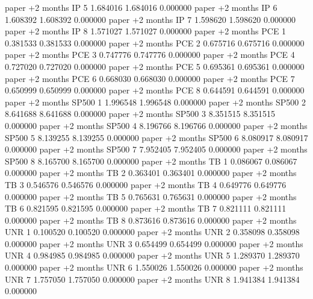      paper +2 months       IP                 5 1.684016       1.684016           0.000000
     paper +2 months       IP                 6 1.608392       1.608392           0.000000
     paper +2 months       IP                 7 1.598620       1.598620           0.000000
     paper +2 months       IP                 8 1.571027       1.571027           0.000000
     paper +2 months      PCE                 1 0.381533       0.381533           0.000000
     paper +2 months      PCE                 2 0.675716       0.675716           0.000000
     paper +2 months      PCE                 3 0.747776       0.747776           0.000000
     paper +2 months      PCE                 4 0.727020       0.727020           0.000000
     paper +2 months      PCE                 5 0.695361       0.695361           0.000000
     paper +2 months      PCE                 6 0.668030       0.668030           0.000000
     paper +2 months      PCE                 7 0.650999       0.650999           0.000000
     paper +2 months      PCE                 8 0.644591       0.644591           0.000000
     paper +2 months    SP500                 1 1.996548       1.996548           0.000000
     paper +2 months    SP500                 2 8.641688       8.641688           0.000000
     paper +2 months    SP500                 3 8.351515       8.351515           0.000000
     paper +2 months    SP500                 4 8.196766       8.196766           0.000000
     paper +2 months    SP500                 5 8.139255       8.139255           0.000000
     paper +2 months    SP500                 6 8.080917       8.080917           0.000000
     paper +2 months    SP500                 7 7.952405       7.952405           0.000000
     paper +2 months    SP500                 8 8.165700       8.165700           0.000000
     paper +2 months       TB                 1 0.086067       0.086067           0.000000
     paper +2 months       TB                 2 0.363401       0.363401           0.000000
     paper +2 months       TB                 3 0.546576       0.546576           0.000000
     paper +2 months       TB                 4 0.649776       0.649776           0.000000
     paper +2 months       TB                 5 0.765631       0.765631           0.000000
     paper +2 months       TB                 6 0.821595       0.821595           0.000000
     paper +2 months       TB                 7 0.821111       0.821111           0.000000
     paper +2 months       TB                 8 0.873616       0.873616           0.000000
     paper +2 months      UNR                 1 0.100520       0.100520           0.000000
     paper +2 months      UNR                 2 0.358098       0.358098           0.000000
     paper +2 months      UNR                 3 0.654499       0.654499           0.000000
     paper +2 months      UNR                 4 0.984985       0.984985           0.000000
     paper +2 months      UNR                 5 1.289370       1.289370           0.000000
     paper +2 months      UNR                 6 1.550026       1.550026           0.000000
     paper +2 months      UNR                 7 1.757050       1.757050           0.000000
     paper +2 months      UNR                 8 1.941384       1.941384           0.000000